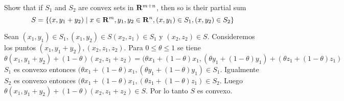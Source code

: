 
\begin{enunciado}{2.16}
    Show that if $S_1$ and $S_2$ are convex sets in $\mathbf{R}^{m+n}$, then so is their partial sum
    \[
        S = \{(x, y_1 + y_2) \mid x \in \mathbf{R}^m, y_1, y_2 \in \mathbf{R}^n, (x, y_1) \in S_1, (x, y_2) \in S_2\}
    \]
\end{enunciado}

Sean $(x_1, y_1) \in S_1, (x_1, y_2) \in S (x_2,z_1) \in S_1$ y $(x_2, z_2) \in S$.
Consideremos los puntos $(x_1, y_1 + y_2), (x_2, z_1, z_2)$.
Para $0\leq \theta \leq 1$ se tiene
\[
    \theta(x_1, y_1 + y_2) + (1 - \theta)(x_2, z_1 + z_2) =
        (\theta x_1 + (1-\theta)x_1, (\theta y_1 + (1-\theta)y_1) + (\theta z_1 + (1-\theta)z_1)
\]
$S_1$ es convexo entonces $(\theta x_1 + (1-\theta)x_1, (\theta y_1 + (1-\theta)y_1) \in S_1$.
Igualmente $S_2$ es convexo entonces $(\theta x_1 + (1-\theta)x_1, (\theta z_1 + (1-\theta)z_1) \in S_2$.
Luego $\theta(x_1, y_1 + y_2) + (1 - \theta)(x_2, z_1 + z_2) \in S$.
Por lo tanto $S$ es convexo.

